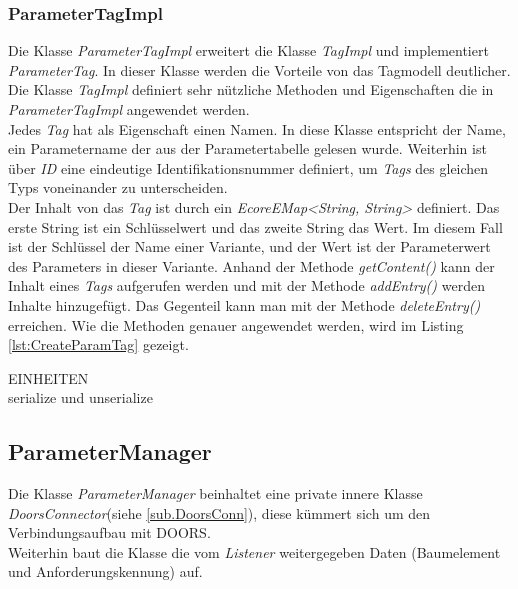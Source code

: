 \subsubsection{ParameterTagImpl}
Die Klasse \textit{ParameterTagImpl} erweitert die Klasse \textit{TagImpl} und implementiert \textit{ParameterTag}. In dieser Klasse werden die Vorteile von das Tagmodell deutlicher. Die Klasse \textit{TagImpl} definiert sehr nützliche Methoden und Eigenschaften die in \textit{ParameterTagImpl} angewendet werden.\\

Jedes \textit{Tag} hat als Eigenschaft einen Namen. In diese Klasse entspricht der Name, ein Parametername der aus der Parametertabelle gelesen wurde. Weiterhin ist über \textit{ID} eine eindeutige Identifikationsnummer definiert, um \textit{Tags} des gleichen Typs voneinander zu unterscheiden.\\

Der Inhalt von das \textit{Tag} ist durch ein \textit{EcoreEMap<String, String>} definiert. Das erste String ist ein Schlüsselwert und das zweite String das Wert. Im diesem Fall ist der Schlüssel der Name einer Variante, und der Wert ist der Parameterwert des Parameters in dieser Variante.  Anhand der Methode \textit{getContent()} kann der Inhalt eines \textit{Tags} aufgerufen werden und mit der Methode \textit{addEntry()} werden Inhalte hinzugefügt. Das Gegenteil kann man mit der Methode \textit{deleteEntry()} erreichen. Wie die Methoden genauer angewendet werden, wird im Listing \ref{lst:CreateParamTag} gezeigt.

EINHEITEN\\

serialize und unserialize\\


\subsection{ParameterManager}\label{sub:ParameterManager}


Die Klasse \textit{ParameterManager} beinhaltet eine private innere Klasse \textit{DoorsConnector}(siehe \ref{sub.DoorsConn}), diese kümmert sich um den Verbindungsaufbau mit DOORS.\\ Weiterhin baut die Klasse die vom \textit{Listener} weitergegeben Daten (Baumelement und Anforderungskennung) auf.\\



